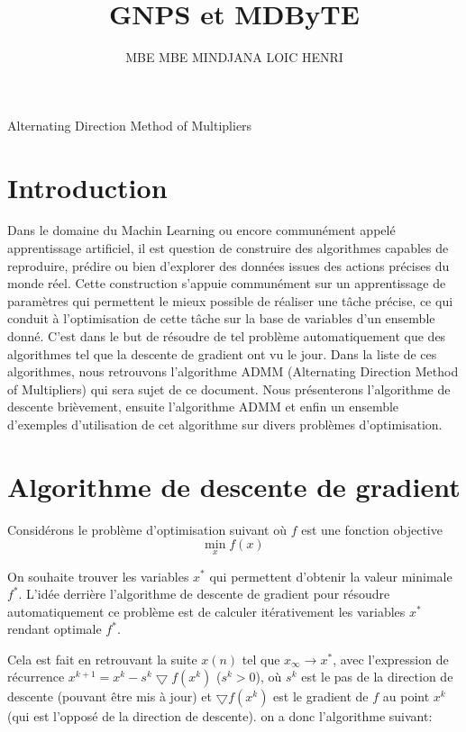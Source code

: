 \documentclass[12pt,a4paper]{report}
\author{MBE MBE MINDJANA LOIC HENRI}
\title{GNPS et MDByTE}
\begin{document}
    
    \pagecouverture
    {Alternating Direction Method of Multipliers}
    {}
	\tableofcontents
	\vspace{20cm}
    
	\section{Introduction}
	Dans le domaine du Machin Learning ou encore communément appelé apprentissage artificiel, il est question de construire des algorithmes capables de reproduire, prédire ou bien d'explorer des données issues des actions précises du monde réel.
	Cette construction s'appuie communément sur un apprentissage de paramètres qui permettent le mieux possible de réaliser une tâche précise, ce qui conduit à l'optimisation de cette tâche sur la base de variables d'un ensemble donné.
	C'est dans le but de résoudre de tel problème automatiquement que des algorithmes tel que la descente de gradient ont vu le jour. Dans la liste de ces algorithmes, nous retrouvons l'algorithme ADMM (Alternating Direction Method of Multipliers) qui sera sujet de ce document.
	Nous présenterons l'algorithme de descente brièvement, ensuite l'algorithme ADMM et enfin un ensemble d'exemples d'utilisation de cet algorithme sur divers problèmes d'optimisation.
    
	\section{Algorithme de descente de gradient}
    	Considérons le problème d'optimisation suivant où $f$ est une fonction objective
    	\begin{equation}
        	\min_{x} f(x)\
        	\label{equa:opscc}
    	\end{equation}
   	 
    	On souhaite trouver les variables $x^*$ qui permettent d'obtenir la valeur minimale $f^*$. L'idée derrière l'algorithme de descente de gradient pour résoudre automatiquement ce problème est de calculer itérativement les variables $x^*$ rendant optimale
    	$f^*$.
   	 
    	Cela est fait en retrouvant la suite $x(n)$ tel que $x_{\infty} \rightarrow x^*$, avec l'expression de récurrence $x^{k+1} = x^k - s^k \bigtriangledown{f(x^k)}$ ($s^k > 0$), où $s^k$ est le pas de la direction de descente (pouvant être mis à jour) et $\bigtriangledown{f(x^k)}$ est le gradient de $f$ au point $x^k$ (qui est l'opposé de la direction de descente). on a donc l'algorithme suivant:
    
\end{document}
